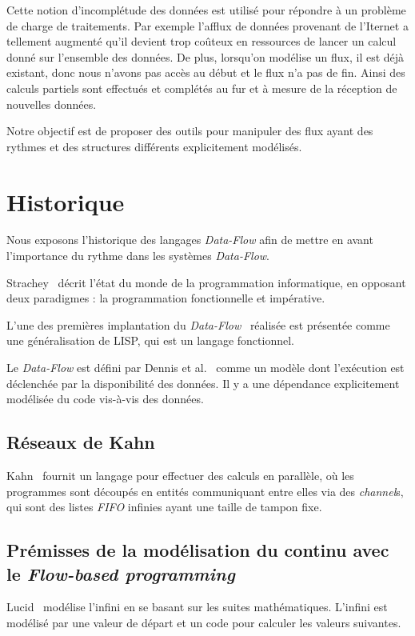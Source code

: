 \documentclass{llncs}
\newcommand{\DF}{\emph{Data-Flow} }
\newcommand{\DFc}{\emph{Data-Flow}}
\newcommand{\DFp}{\emph{Data-Flow}. }
\newcommand{\FB}{\emph{Flow-based programming} }
\begin{document}
Cette notion d'incomplétude des données est utilisé pour répondre à un problème
de charge de traitements.
Par exemple l'afflux de données provenant de l'Iternet a tellement augmenté qu'il
devient trop coûteux en ressources de lancer un calcul donné sur l'ensemble des
données.
De plus, lorsqu'on modélise un flux, il est déjà existant, donc nous n'avons pas
accès au début et le flux n'a pas de fin.
Ainsi des calculs partiels sont effectués et complétés au fur et à mesure de la
réception de nouvelles données.

Notre objectif est de proposer des outils pour manipuler des flux ayant des
rythmes et des structures différents explicitement modélisés.

\section{Historique}
Nous exposons l'historique des langages \DF afin
de mettre en avant l'importance du rythme dans les systèmes \DFp

Strachey~\cite{Strachey73} décrit l'état du monde de la programmation
informatique, en opposant deux paradigmes : la programmation fonctionnelle et impérative.

L'une des premières implantation du \DFc~\cite{Dennis72} réalisée
est présentée comme une généralisation de LISP, qui est un langage fonctionnel.

Le \DF est défini par Dennis et al.~\cite{Dennis72} comme un modèle dont l'exécution
est déclenchée par la disponibilité des données.
Il y a une dépendance explicitement modélisée du code vis-à-vis des données.

\subsection{Réseaux de Kahn}
Kahn~\cite{Kahn74} fournit un langage pour effectuer des calculs en parallèle,
où les programmes sont découpés en entités communiquant entre elles via des
\emph{channel}s, qui sont des listes \emph{FIFO} infinies ayant une taille de
tampon fixe.

\subsection{Prémisses de la modélisation du continu avec le \FB}
Lucid~\cite{AshcroftW76} modélise l'infini en se basant sur les suites mathématiques.
L'infini est modélisé par une valeur de départ et un code pour calculer les valeurs
suivantes.
\end{document}
